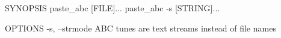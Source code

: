 SYNOPSIS
  paste_abc [FILE]...
  paste_abc -s [STRING]...

OPTIONS
  -s, --strmode
    ABC tunes are text streams instead of file names
